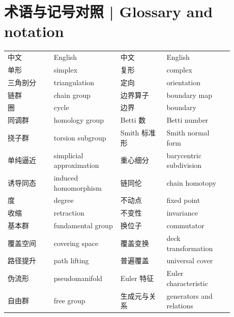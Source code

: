 \documentclass[UTF8,11pt,a4paper]{ctexart}
\begin{document}
\section*{术语与记号对照 | Glossary and notation}
\begin{center}
\small
\begin{tabular}{p{0.18\linewidth}p{0.26\linewidth}p{0.18\linewidth}p{0.26\linewidth}}
中文 & English & 中文 & English\\
单形 & simplex & 复形 & complex\\
三角剖分 & triangulation & 定向 & orientation\\
链群 & chain group & 边界算子 & boundary map\\
圈 & cycle & 边界 & boundary\\
同调群 & homology group & Betti 数 & Betti number\\
挠子群 & torsion subgroup & Smith 标准形 & Smith normal form\\
单纯逼近 & simplicial approximation & 重心细分 & barycentric subdivision\\
诱导同态 & induced homomorphism & 链同伦 & chain homotopy\\
度 & degree & 不动点 & fixed point\\
收缩 & retraction & 不变性 & invariance\\
基本群 & fundamental group & 换位子 & commutator\\
覆盖空间 & covering space & 覆盖变换 & deck transformation\\
路径提升 & path lifting & 普遍覆盖 & universal cover\\
伪流形 & pseudomanifold & Euler 特征 & Euler characteristic\\
自由群 & free group & 生成元与关系 & generators and relations\\
\end{tabular}
\end{center}
\end{document}
